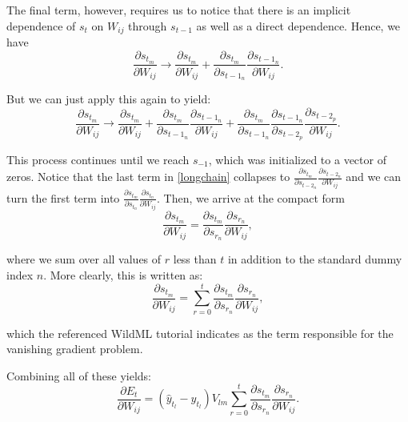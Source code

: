 \documentclass[11pt,twoside]{article}
\begin{document}
\noindent The final term, however, requires us to notice that there is an implicit dependence of $s_t$ on $W_{ij}$ through $s_{t-1}$ as well as a direct dependence. Hence, we have
\begin{equation}
\frac{\partial s_{t_m}}{\partial W_{ij}} \rightarrow \frac{\partial s_{t_m}}{\partial W_{ij}}+\frac{\partial s_{t_m}}{\partial s_{{t-1}_n}}\frac{\partial s_{{t-1}_n}}{\partial W_{ij}}.
\end{equation}

\noindent But we can just apply this again to yield:
\begin{equation}
\label{longchain}
\frac{\partial s_{t_m}}{\partial W_{ij}} \rightarrow \frac{\partial s_{t_m}}{\partial W_{ij}}
	+\frac{\partial s_{t_m}}{\partial s_{{t-1}_n}}\frac{\partial s_{{t-1}_n}}{\partial W_{ij}}
	+\frac{\partial s_{t_m}}{\partial s_{{t-1}_n}}\frac{\partial s_{{t-1}_n}}{\partial s_{{t-2}_p}}\frac{\partial s_{{t-2}_p}}{\partial W_{ij}}.
\end{equation}

\noindent This process continues until we reach $s_{-1}$, which was initialized to a vector of zeros. Notice that the last term in \eqref{longchain} collapses to $\frac{\partial s_{t_m}}{\partial s_{{t-2}_n}}\frac{\partial s_{{t-2}_n}}{\partial W_{ij}}$ and we can turn the first term into $\frac{\partial s_{t_m}}{\partial s_{t_n}}\frac{\partial s_{t_n}}{\partial W_{ij}}$. Then, we arrive at the compact form
\begin{equation}
\frac{\partial s_{t_m}}{\partial W_{ij}}=\frac{\partial s_{t_m}}{\partial s_{r_n}}\frac{\partial s_{r_n}}{\partial W_{ij}},
\end{equation}

\noindent where we sum over all values of $r$ less than $t$ in addition to the standard dummy index $n$. More clearly, this is written as:
\begin{equation}
\frac{\partial s_{t_m}}{\partial W_{ij}}=\sum_{r=0}^{t}\frac{\partial s_{t_m}}{\partial s_{r_n}}\frac{\partial s_{r_n}}{\partial W_{ij}},
\end{equation}

\noindent which the referenced WildML tutorial indicates as the term responsible for the vanishing gradient problem.

\noindent Combining all of these yields:
\begin{equation}
\frac{\partial E_t}{\partial W_{ij}}=\left(\hat{y}_{t_l}-y_{t_l}\right)V_{lm}\sum_{r=0}^{t}\frac{\partial s_{t_m}}{\partial s_{r_n}}\frac{\partial s_{r_n}}{\partial W_{ij}}.
\end{equation}
\end{document}
